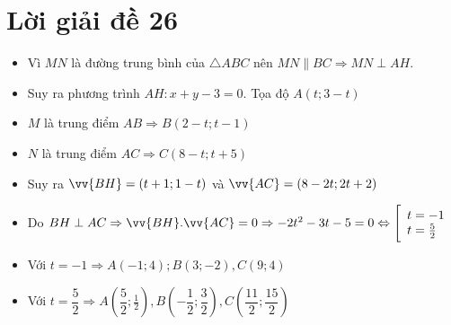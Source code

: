 \section{Lời giải đề 26}
\lgi 
\begin{itemize}[label=,leftmargin=*]
\item Vì $MN$ là đường trung bình của $\triangle ABC$ nên $MN\parallel BC\Rightarrow MN\perp AH$.	
\item Suy ra phương trình $AH:x+y-3=0$. Tọa độ $A(t;3-t)$
\item $M$ là trung điểm $AB\Rightarrow B(2-t;t-1)$
\item $N$ là trung điểm $AC\Rightarrow C(8-t;t+5)$
\item Suy ra $\vv{BH}=(t+1;1-t)$ và $\vv{AC}=(8-2t;2t+2)$
\item Do $BH\perp AC\Rightarrow \vv{BH}.\vv{AC}=0\Rightarrow -2t^2-3t-5=0 \Leftrightarrow \hay{t=-1 \\ t=\frac{5}{2}}$
\item Với $t=-1\Rightarrow A(-1;4);B(3;-2),C(9;4)$
\item Với $t=\dfrac{5}{2}\Rightarrow A\left(\dfrac{5}{2};\frac{1}{2} \right),B\left(-\dfrac{1}{2};\dfrac{3}{2} \right),C\left(\dfrac{11}{2};\dfrac{15}{2} \right)$
\end{itemize}

